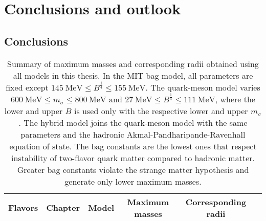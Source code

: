 \chapter{Conclusions and outlook}

\section{Conclusions}

\begin{table}[b!]
\centering
\caption{\label{tab:master_conclusion:results}%
Summary of maximum masses and corresponding radii obtained using all models in this thesis.
In the MIT bag model, all parameters are fixed except $\SI{145}{\mega\electronvolt} \leq B^\frac14 \leq \SI{155}{\mega\electronvolt}$.
The quark-meson model varies 
$\SI{600}{\mega\electronvolt} \leq m_\sigma \leq \SI{800}{\mega\electronvolt}$
and
$\SI{27}{\mega\electronvolt} \leq B^\frac14 \leq \SI{111}{\mega\electronvolt}$,
where the lower and upper $B$ is used only with the respective lower and upper $m_\sigma$.
The hybrid model joins the quark-meson model with the same parameters and the hadronic Akmal-Pandharipande-Ravenhall equation of state.
The bag constants are the lowest ones that respect instability of two-flavor quark matter compared to hadronic matter.
Greater bag constants violate the strange matter hypothesis and generate only lower maximum masses.
}
{\setlength{\tabcolsep}{4pt} %
\begin{tabular}{ c l l c c c }
	\toprule
	Flavors & Chapter & Model & Maximum masses & Corresponding radii                            \\
	\midrule

\end{tabular}}
\end{table}
